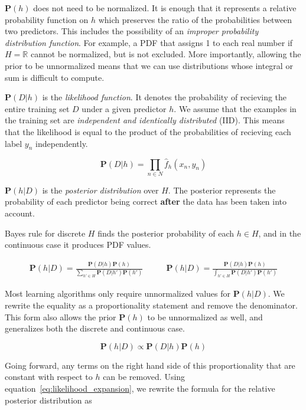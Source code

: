 \documentclass[twoside]{article}
\begin{document}
\(\mathbf{P}(h)\) does not need to be normalized. It is enough that it represents a relative probability function on \(h\) which preserves the ratio of the probabilities between two predictors. This includes the possibility of an \textit{improper probability distribution function}. For example, a PDF that assigns 1 to each real number if \(H=\mathbb{R}\) cannot be normalized, but is not excluded. More importantly, allowing the prior to be unnormalized means that we can use distributions whose integral or sum is difficult to compute.

\(\mathbf{P}(D|h)\) is the \textit{likelihood function}. It denotes the probability of recieving the entire training set \(D\) under a given predictor \(h\). We assume that the examples in the training set are \textit{independent and identically distributed} (IID). This means that the likelihood is equal to the product of the probabilities of recieving each label \(y_n\) independently.

\begin{equation}
\label{eq:likelihood_expansion}
\mathbf{P}(D|h)=\prod_{n \in N} \hat{f}_h(x_n,y_n)
\end{equation}

\(\mathbf{P}(h|D)\) is the \textit{posterior distribution} over \(H\). The posterior represents the probability of each predictor being correct \textbf{after} the data has been taken into account.

Bayes rule for discrete \(H\) finds the posterior probability of each \(h \in H\), and in the continuous case it produces PDF values.

\begin{align}
\mathbf{P}(h|D)=\frac{\mathbf{P}(D|h)\mathbf{P}(h)}{\sum_{h' \in H}\mathbf{P}(D|h')\mathbf{P}(h')} &
\qquad\mathbf{P}(h|D)=\frac{\mathbf{P}(D|h)\mathbf{P}(h)}{\int_{h' \in H}\mathbf{P}(D|h')\mathbf{P}(h')}
\end{align}

Most learning algorithms only require unnormalized values for \(\mathbf{P}(h|D)\). We rewrite the equality as a proportionality statement and remove the denominator. This form also allows the prior \(\mathbf{P}(h)\) to be unnormalized as well, and generalizes both the discrete and continuous case.

\begin{equation}
\label{eq:bayes}
\mathbf{P}(h|D)\propto\mathbf{P}(D|h)\mathbf{P}(h)
\end{equation}

Going forward, any terms on the right hand side of this proportionality that are constant with respect to \(h\) can be removed. Using equation~\eqref{eq:likelihood_expansion}, we rewrite the formula for the relative posterior distribution as
\end{document}
